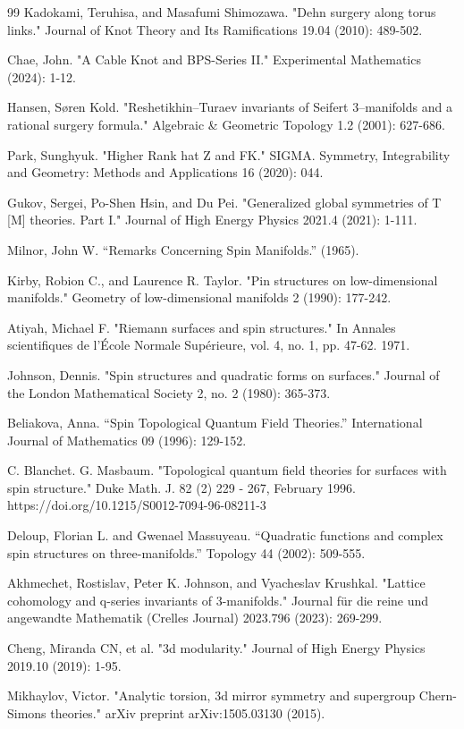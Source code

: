 \documentclass{article}
\numberwithin{corollary}{theorem}
\numberwithin{corollary}{proposition}
\begin{document}
\begin{thebibliography}{99}
Kadokami, Teruhisa, and Masafumi Shimozawa. "Dehn surgery along torus links." Journal of Knot Theory and Its Ramifications 19.04 (2010): 489-502.

Chae, John. "A Cable Knot and BPS-Series II." Experimental Mathematics (2024): 1-12.

Hansen, Søren Kold. "Reshetikhin–Turaev invariants of Seifert 3–manifolds and a rational surgery formula." Algebraic \& Geometric Topology 1.2 (2001): 627-686.

Park, Sunghyuk. "Higher Rank hat Z and FK." SIGMA. Symmetry, Integrability and Geometry: Methods and Applications 16 (2020): 044.



Gukov, Sergei, Po-Shen Hsin, and Du Pei. "Generalized global symmetries of T [M] theories. Part I." Journal of High Energy Physics 2021.4 (2021): 1-111.

 Milnor, John W. “Remarks Concerning Spin Manifolds.” (1965).

 Kirby, Robion C., and Laurence R. Taylor. "Pin structures on low-dimensional manifolds." Geometry of low-dimensional manifolds 2 (1990): 177-242.

Atiyah, Michael F. "Riemann surfaces and spin structures." In Annales scientifiques de l'École Normale Supérieure, vol. 4, no. 1, pp. 47-62. 1971.

 Johnson, Dennis. "Spin structures and quadratic forms on surfaces." Journal of the London Mathematical Society 2, no. 2 (1980): 365-373.

 Beliakova, Anna. “Spin Topological Quantum Field Theories.” International Journal of Mathematics 09 (1996): 129-152.

C. Blanchet. G. Masbaum. "Topological quantum field theories for surfaces with spin structure." Duke Math. J. 82 (2) 229 - 267, February 1996. https://doi.org/10.1215/S0012-7094-96-08211-3

Deloup, Florian L. and Gwenael Massuyeau. “Quadratic functions and complex spin structures on three-manifolds.” Topology 44 (2002): 509-555.

 Akhmechet, Rostislav, Peter K. Johnson, and Vyacheslav Krushkal. "Lattice cohomology and q-series invariants of 3-manifolds." Journal für die reine und angewandte Mathematik (Crelles Journal) 2023.796 (2023): 269-299.

Cheng, Miranda CN, et al. "3d modularity." Journal of High Energy Physics 2019.10 (2019): 1-95.

Mikhaylov, Victor. "Analytic torsion, 3d mirror symmetry and supergroup Chern-Simons theories." arXiv preprint arXiv:1505.03130 (2015).


\end{thebibliography}
\end{document}
